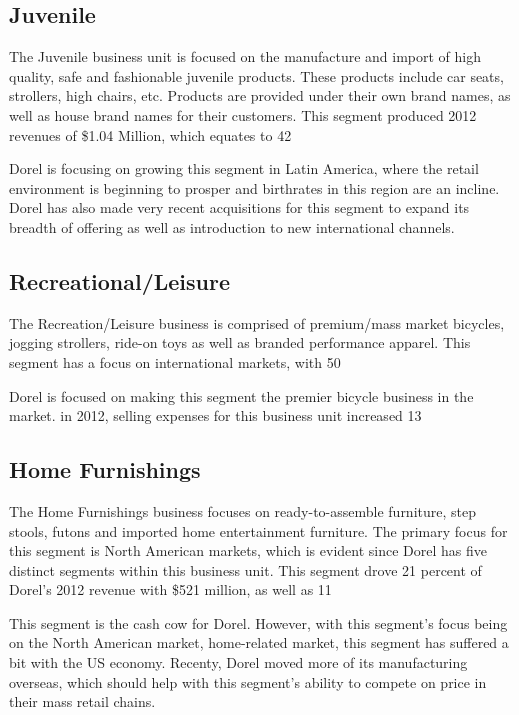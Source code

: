 \subsection{Juvenile}
The Juvenile business unit is focused on the manufacture and import of high quality, safe and fashionable juvenile products.  These products include car seats, strollers, high chairs, etc.  Products are provided under their own brand names, as well as house brand names for their customers. This segment produced 2012 revenues of \$1.04 Million, which equates to 42%

Dorel is focusing on growing this segment in Latin America, where the retail environment is beginning to prosper and birthrates in this region are an incline. Dorel has also made very recent acquisitions for this segment to expand its breadth of offering as well as introduction to new international channels.

\subsection{Recreational/Leisure}
The Recreation/Leisure business is comprised of premium/mass market bicycles, jogging strollers, ride-on toys as well as branded performance apparel.  This segment has a focus on international markets, with 50%

Dorel is focused on making this segment the premier bicycle business in the market. in 2012, selling expenses for this business unit increased 13%

\subsection{Home Furnishings}
The Home Furnishings business focuses on ready-to-assemble furniture, step stools, futons and imported home entertainment furniture.  The primary focus for this segment is North American markets, which is evident since Dorel has five distinct segments within this business unit. This segment drove 21 percent of Dorel’s 2012 revenue with \$521 million, as well as 11%

This segment is the cash cow for Dorel.  However, with this segment’s focus being on the North American market, home-related market, this segment has suffered a bit with the US economy.  Recenty, Dorel moved more of its manufacturing overseas, which should help with this segment’s ability to compete on price in their mass retail chains.


